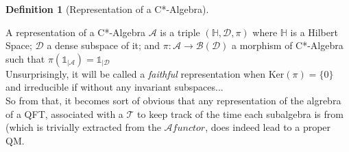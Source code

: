\documentclass[a4paper,11pt]{article}
\numberwithin{equation}{section}
\theoremstyle{definition}
\newtheorem{definition}{Definition}
\newtheorem{comment}{Comment}
\begin{document}
\begin{definition}[Representation of a C*-Algebra]$\quad$

    A representation of a C*-Algebra $\mathcal{A}$ is a triple $(\mathbb{H},\mathcal{D},\pi)$ where $\mathbb{H}$ is a Hilbert Space; $\mathcal{D}$ a dense subspace of it; and $\pi : \mathcal{A}\to\mathcal{B}(\mathcal{D})$ a morphism of C*-Algebra such that $\pi(\mathds{1}_{|\mathcal{A}})=\mathds{1}_{|\mathcal{D}}$\\
    Unsurprisingly, it will be called a \emph{faithful} representation when $\mathrm{Ker}(\pi)=\{0\}$ and irreducible if without any invariant subspaces...
    \\ So from that, it becomes sort of obvious that any representation of the algrebra of a QFT, associated with a $\mathcal{T}$ to keep track of the time each subalgebra is from (which is trivially extracted from the $\mathcal{A} functor$, does indeed lead to a proper QM.
\end{definition}

\end{document}
